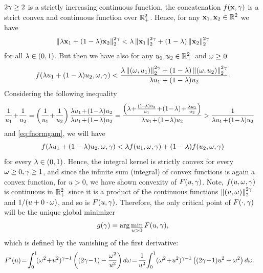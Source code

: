 \documentclass[12pt,onecolumn,journal,draftclsnofoot,letterpaper]{IEEEtran}
\begin{document}
  $2\gamma\geq2$ is a strictly increasing continuous function, the concatenation $f({\mathbf x},\gamma)$ is a strict convex and
  continuous function over ${\mathbb R}_+^2$. Hence, for any ${\mathbf x}_1,{\mathbf x}_2\in{\ensuremath{\mathbb R}}^2$ we have
  \begin{align}
     \left\|\lambda{\ensuremath{\mathbf x}}_1+(1-\lambda){\mathbf x}_2\right\| _2^{2\gamma}<\lambda  \left\|{\mathbf x}_1\right\| _2^{2\gamma} + (1-\lambda) \left\|{\mathbf x}_2\right\| _2^{2\gamma}
  \end{align}
  for all $\lambda\in(0,1)$. But then we have also for any $u_1,u_2\in{\ensuremath{\mathbb R}}^2_+$ and $\omega\geq 0$ 
  \begin{align}
    f(\lambda u_1 +(1-\lambda)u_2,\omega,\gamma) < 
    \frac{\lambda \left\|(\omega,u_1)\right\| _2^{2\gamma} + (1-\lambda) \left\|(\omega,u_2)\right\| _2^{2\gamma}}{\lambda u_1+(1-\lambda)u_2}
    \label{eq:fnormgam}.
  \end{align}
  Considering the following inequality 
  \begin{align}
    \frac{1}{u_1}\! +\!\frac{1}{u_2} &=
       \left(\frac{1}{u_1}\! + \!\frac{1}{u_2}\right)\frac{\lam u_1 \!+\!(1\!-\!\lam)u_2}{\lam u_1 \!+\! (1\!-\!\lam)u_2}
       =\frac{ \left(\lam\! +\!\frac{(1\!-\!\lam)u_2}{u_1}\! +\! (1\!-\!\lam) \!+\! \frac{\lam u_1}{u_2}\right)}{\lam
       u_1 \!+\! (1\!-\!\lam)u_2} 
       > \frac{1}{\lam u_1\! +\! (1\!-\!\lam)u_2}\notag
  \end{align}
  and \eqref{eq:fnormgam}, we will have
  \begin{align}
    f(\lambda u_1 +(1-\lambda)u_2,\omega,\gamma) < \lambda f(u_1,\omega,\gamma) + (1-\lambda)f(u_2,\omega,\gamma) 
  \end{align}
  for every $\lambda\in(0,1)$. Hence, the integral kernel is strictly convex for every $\omega\geq0,\gamma\geq 1$, and since the
  infinite sum (integral) of convex functions is again a convex function, for $u>0$, we have shown convexity of $F(u,\gamma)$. 
  Note, $f(u,\omega,\gamma)$ is continuous in ${\mathbb R}_+^2$ since it is a product of the continuous functions
  $ \left\|(u,\omega)\right\| _2^{2\gamma}$ and $1/(u+0\cdot\omega)$, and so is $F(u,\gamma)$. 
  Therefore, the only critical point of $F(\cdot,\gamma)$ will be the unique global minimizer
  \begin{align}
    g(\gamma)=\arg\min_{u>0} F(u,\gamma),
  \end{align}
  which is defined by the  vanishing of the first derivative:
  \begin{align}
    F'(u)  &\!= \!\int_0^{1}\! (\ome^2\!+\!u^2)^{\gam-1} \left( (2\gam\!-\!1)-\frac{\ome^2}{u^2}\right)d\ome
    \!=\!\frac{1}{u^{2}}\!\int_{0}^{1} (\ome^2\!+\!u^2)^{\gam-1}\left((2\gam\!-\!1)u^2-\ome^2\right)d\ome\label{eq:Fderivative}.
  \end{align}
\end{document}
